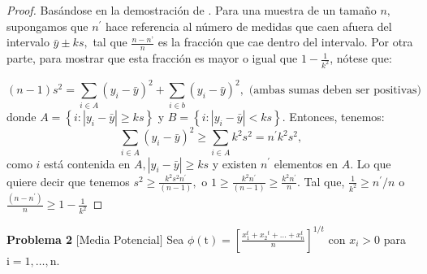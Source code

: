 \documentclass[a4paper,12pt]{article}
\begin{document}
\begin{proof}
    Basándose en la demostración de \cite{wackerly2014mathematical}. Para una muestra de un tamaño $n,$ supongamos que $n^{\prime}$ hace referencia al número de medidas que caen afuera del intervalo $\bar{y} \pm k s,$ tal que $\frac{n-n’}{n}$ es la fracción que cae dentro del intervalo. Por otra parte, para mostrar que esta fracción es mayor o igual que $1-\frac{1}{ k^{2}}$, nótese que: 

$$
(n-1) s^{2}=\sum_{i \in A}\left(y_{i}-\bar{y}\right)^{2}+\sum_{i \in b}\left(y_{i}-\bar{y}\right)^{2}, \text { (ambas sumas deben ser positivas) }
$$
donde $A=\left\{i:\left|y_{i}-\bar{y}\right| \geq k s\right\}$ y $B=\left\{i:\left|y_{i}-\bar{y}\right|<k s\right\} .$ Entonces, tenemos: 
$$\sum_{i \in A}\left(y_{i}-\bar{y}\right)^{2} \geq \sum_{i \in A} k^{2} s^{2}=n^{\prime} k^{2} s^{2},$$ como $i$ está contenida en $A,\left|y_{i}-\bar{y}\right| \geq k s$ y existen $n^{\prime}$ elementos en $A$. Lo que quiere decir que tenemos $s^{2} \geq \frac{k^{2} s^{2} n^{\prime}} {(n-1)},$ o $1 \geq \frac{k^{2} n^{\prime}}{(n-1)} \geq \frac{k^{2} n^{\prime}}{n} .$  Tal que, $\frac{1}{ k^{2}} \geq n^{\prime} / n$ o $\frac{\left(n-n^{\prime}\right)}{ n} \geq 1-\frac{1}{ k^{2}}$
\end{proof}

\textbf{Problema 2}
$[$Media Potencial$]$ Sea $\phi(\mathrm{t})= \displaystyle \left[\frac{x_{1}^{t}+x_{2}{ }^{t}+\ldots+x_{n}^{t}}{n}\right]^{1/t}$ con $x_{i}>0$ para $\mathrm{i}=1, \ldots, \mathrm{n}$.
\end{document}
